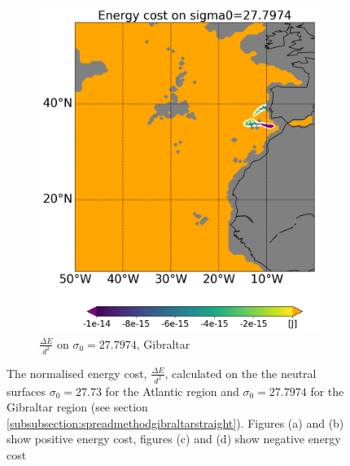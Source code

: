 \begin{figure}[htbp]
\begin{subfigure}[b]{0.4\textwidth}
         \includegraphics[width=\textwidth]{plots/energy/gibraltar_energy/Map2dcyl_neg_energy_on_sigma0_2779e-2_reg310Eto360E05Nto57N_1990to1998av_WOCE.png}
         \caption{$\frac{\Delta E}{d^2}$ on $\sigma_0 = 27.7974$, Gibraltar}
         \label{fig:subplot_gibraltar_neg_energy_sigma_0}
     \end{subfigure}
     
    \caption{The normalised energy cost, $\frac{\Delta E}{d^2}$, calculated on the the neutral surfaces $\sigma_0 = 27.73$ for the Atlantic region and  $\sigma_0 = 27.7974$ for the Gibraltar region (see section \ref{subsubsection:spreadmethodgibraltarstraight}). Figures (a) and (b) show positive energy cost, figures (c) and (d) show negative energy cost}
    \label{fig:energy_sigma_0}
    
\end{figure}

